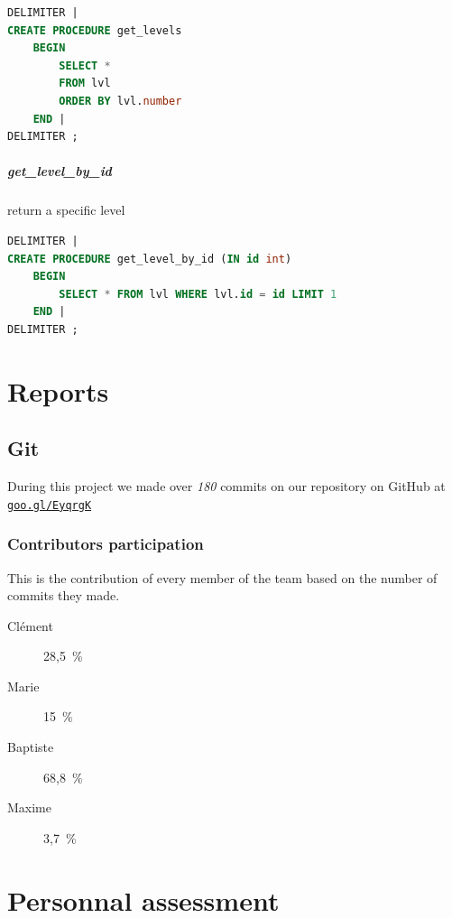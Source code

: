 \documentclass{report}
\begin{document}
\begin{lstlisting}[language=SQL]
DELIMITER |                                                      
CREATE PROCEDURE get_levels
	BEGIN
		SELECT *
		FROM lvl
		ORDER BY lvl.number
	END |
DELIMITER ;
\end{lstlisting}

\paragraph{get\_level\_by\_id} return a specific level

\begin{lstlisting}[language=SQL]
DELIMITER |                                                      
CREATE PROCEDURE get_level_by_id (IN id int)
	BEGIN
		SELECT * FROM lvl WHERE lvl.id = id LIMIT 1
	END |
DELIMITER ;
\end{lstlisting}

\chapter{Reports}

\section{Git}

During this project we made over \emph{180} commits on our repository on GitHub at \texttt{\href{https://github.com/EpicKiwi/Lorann-Ex/}{goo.gl/EyqrgK}}

\subsection{Contributors participation}

This is the contribution of every member of the team based on the number of commits they made.

\begin{multicols}{4}
\begin{description}
\item [Clément] 28,5\ \%
\item [Marie] 15\ \%
\item [Baptiste] 68,8\ \%
\item [Maxime] 3,7\ \%
\end{description}
\end{multicols}

\chapter{Personnal assessment}
\end{document}
